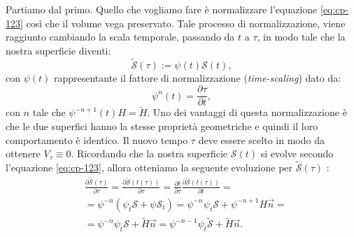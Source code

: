 Partiamo dal primo. Quello che vogliamo fare è normalizzare l'equazione \eqref{eq:cp-123} così che il volume vega preservato. Tale processo di normalizzazione, viene raggiunto cambiando la scala temporale, passando da $t$ a $\tau$, in modo tale che la nostra superficie diventi:
\[
\mathcal{\tilde{S}}(\tau):=\psi(t)\mathcal{S}(t),
\]
con $\psi(t)$ rappresentante il fattore di normalizzazione (\emph{time-scaling}) dato da:
\[
\psi^n(t) = \frac{\partial \tau}{\partial t},
\]
con $n$ tale che $\psi^{-n+1}(t)H=\tilde{H}$. Uno dei vantaggi di questa normalizzazione è che le due superfici hanno la stesse proprietà geometriche e quindi il loro comportamento è identico. Il nuovo tempo $\tau$ deve essere scelto in modo da ottenere $V_{\tau}\equiv 0$. Ricordando che la nostra superficie $\mathcal{S}(t)$ si evolve secondo l'equazione \eqref{eq:cp-123}, allora otteniamo la seguente evoluzione per $\mathcal{\tilde{S}}(\tau)$ : 
\[
\begin{aligned}
  &\frac{\partial\mathcal{\tilde{S}}(\tau)}{\partial\tau} =  \frac{\partial\mathcal{\tilde{S}}(t(\tau))}{\partial\tau} = \frac{\partial t}{\partial\tau}\frac{\partial\mathcal{\tilde{S}}(t(\tau))}{\partial t} =\\
  &=\psi^{-n}\left(\psi_t\mathcal{S}+\psi\mathcal{S}_t\right)=\psi^{-n}\psi_t\mathcal{S}+\psi^{-n+1}H\vec{n}=\\
  &=\psi^{-n}\psi_t\mathcal{S}+\tilde{H}\vec{n}=\psi^{-n-1}\psi_t\mathcal{\tilde{S}}+\tilde{H}\vec{n}.
\end{aligned}
\]

